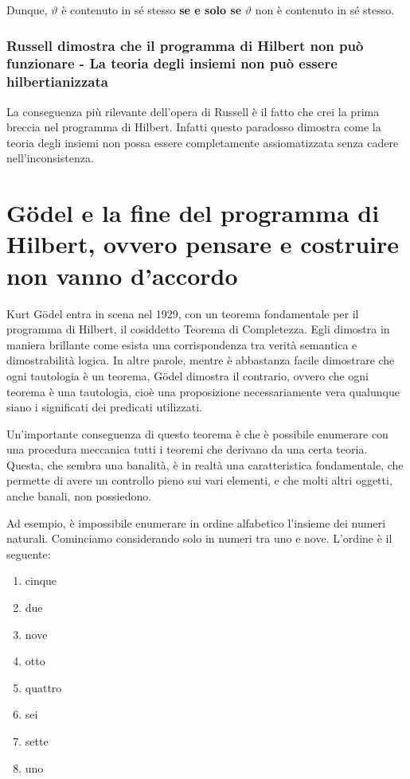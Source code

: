 \documentclass[a4paper,10pt]{article}
\begin{document}
Dunque, $\vartheta$ è contenuto in sé stesso \textbf{se e solo se}  $\vartheta$ non è contenuto in sé stesso.


\subsubsection{Russell dimostra che il programma di Hilbert non può funzionare - La teoria degli insiemi non può essere hilbertianizzata}
La conseguenza più rilevante dell'opera di Russell è il fatto che crei la prima breccia nel programma di Hilbert. Infatti questo paradosso dimostra come la teoria degli insiemi non possa essere completamente assiomatizzata senza cadere nell'inconsistenza.

\section{Gödel e la fine del programma di Hilbert, ovvero pensare e costruire non vanno d'accordo}
Kurt Gödel entra in scena nel 1929, con un teorema fondamentale per il programma di Hilbert, il cosiddetto Teorema di Completezza. Egli dimostra in maniera brillante come esista una corrispondenza tra verità semantica e dimostrabilità logica. In altre parole, mentre è abbastanza facile dimostrare che ogni tautologia è un teorema, Gödel dimostra il contrario, ovvero che ogni teorema è una tautologia, cioè una proposizione necessariamente vera qualunque siano i significati dei predicati utilizzati.

Un'importante conseguenza di questo teorema è che è possibile enumerare con una procedura meccanica tutti i teoremi che derivano da una certa teoria.
Questa, che sembra una banalità, è in realtà una caratteristica fondamentale, che permette di avere un controllo pieno sui vari elementi, e che molti altri oggetti, anche banali, non possiedono. \cite{maraschini-palma}

Ad esempio, è impossibile enumerare in ordine alfabetico l'insieme dei numeri naturali.
Cominciamo considerando solo in numeri tra uno e nove. L'ordine è il seguente:
\begin{enumerate}
  \item cinque
  \item due
  \item nove
  \item otto
  \item quattro
  \item sei
  \item sette
  \item uno
\end{enumerate}
\end{document}
